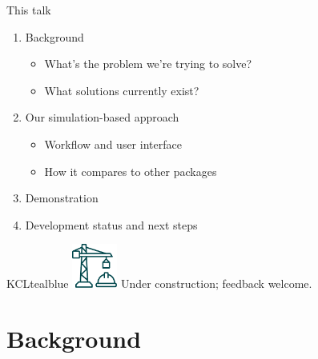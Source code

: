 \documentclass[11pt]{beamer}
\newcommand{\sgap}{\vspace{0.5em}}
\begin{document}
\begin{frame}[t]{This talk}
    \sgap
	\Large
	\begin{enumerate}
		\item Background
		      \begin{itemize}
			      \item What's the problem we're trying to solve?
			      \item What solutions currently exist?
		      \end{itemize}
		\item Our simulation-based approach
		      \begin{itemize}
			      \item Workflow and user interface
			      \item How it compares to other packages
		      \end{itemize}
		\item Demonstration
		\item Development status and next steps
	\end{enumerate}

    \normalsize
	\vspace{6mm}
	\begin{cbox}{KCLtealblue}{}
		\centering
		\includegraphics[width=4em,valign=c]{figures/construction-site.pdf}
		\hspace{2em} {\large Under construction; feedback welcome.}
	\end{cbox}

\end{frame}

\section{Background}
\end{document}
